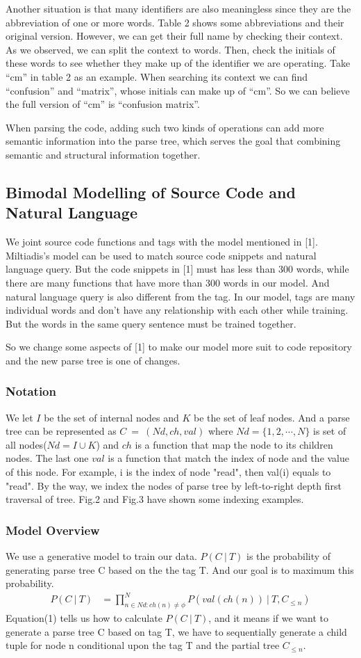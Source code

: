 Another situation is that many identifiers are also meaningless since they are the abbreviation of one or more words. Table 2 shows some abbreviations and
their original version. However, we can get their full name by checking their context. As we observed, we can split the context to words. Then, check the
initials of these words to see whether they make up of the identifier we are operating. Take ``cm'' in table 2 as an example. When searching its context we can
find ``confusion'' and ``matrix'', whose initials can make up of ``cm''. So we can believe the full version of ``cm'' is ``confusion matrix''.

When parsing the code, adding such two kinds of operations can add more semantic information into the parse tree, which serves the goal that combining
semantic and structural information together.

\subsection{Bimodal Modelling of Source Code and Natural Language}
We joint source code functions and tags with the model mentioned in [1]. Miltiadis's model can be used to match source code snippets and natural language query. But the code snippets in [1] must has less than 300 words, while there are many functions that have more than 300 words in our model. And natural language query is also different from the tag. In our model, tags are many individual words and don't have any relationship with each other while training. But the words in the same query sentence must be trained together.

So we change some aspects of [1] to make our model more suit to code repository and the new parse tree is one of changes.
\subsubsection{Notation}
We let $I$ be the set of internal nodes and $K$ be the set of leaf nodes. And a parse tree can be represented as $C\ =\ (Nd,ch,val)$ where $Nd=\{1,2,\cdots,N\}$ is set of all nodes($Nd=I\cup K$) and $ch$ is a function that map the node to its children nodes. The last one $val$ is a function that match the index of node and the value of this node. For example, i is the index of node "read", then val(i) equals to "read". By the way, we index the nodes of parse tree by left-to-right depth first traversal of tree. Fig.2 and Fig.3 have shown some indexing examples.
\subsubsection{Model Overview}
We use a generative model to train our data. $P(C\ |\ T)$ is the probability of generating parse tree C based on the the tag T. And our goal is to maximum this probability.
\begin{align}
    P(C\ |\ T) & = \prod_{n\in Nd:ch(n)\neq\phi}^N P(val(ch(n))\ |\ T,C_{\leq n})
\end{align}
Equation(1) tells us how to calculate $P(C\ |\ T)$, and it means if we want to generate a parse tree C based on tag T, we have to sequentially generate a child tuple for node n conditional upon the tag T and the partial tree $C_{\leq n}$.

